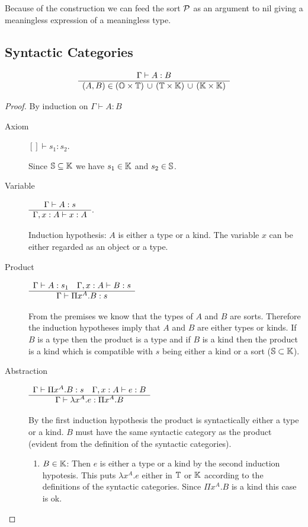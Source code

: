 Because of the construction we can feed the sort ${\cal P}$ as an argument to
$\text{nil}$ giving a meaningless expression of a meaningless type.


\subsection{Syntactic Categories}

\begin{theorem}
  $$
  \begin{array}{c} \Gamma \vdash A : B \\ \hline (A,B) \in
    (\mathbb{O} \times \mathbb{T}) \,\cup\,
    (\mathbb{T}   \times \mathbb{K}) \,\cup\,
    (\mathbb{K}   \times \mathbb{K})
  \end{array}
  $$
  \begin{proof} By induction on $\Gamma \vdash A : B$
    \begin{description}

    \item[Axiom] $[] \vdash s_1 : s_2$.

      Since $\mathbb{S} \subseteq \mathbb{K}$ we have $s_1 \in \mathbb{K}$ and $s_2 \in
      \mathbb{S}$.


    \item[Variable] $\begin{array}{c} \Gamma \vdash A:s \\ \hline \Gamma,x:A \vdash x: A\end{array}$.

      Induction hypothesis: $A$ is either a type or a kind. The variable $x$
      can be either regarded as an object or a type.

    \item[Product]
      $
      \begin{array}{c} \Gamma \vdash A: s_1 \quad \Gamma,x:A \vdash B:s \\ \hline \Gamma \vdash \Pi x^A . B : s\end{array}
      $

      From the premises we know that the types of $A$ and $B$ are
      sorts. Therefore the induction hypotheses imply that $A$ and $B$ are
      either types or kinds. If $B$ is a type then the product is a type and
      if $B$ is a kind then the product is a kind which is compatible with $s$
      being either a kind or a sort ($\mathbb{S} \subset \mathbb{K}$).

    \item[Abstraction]
      $\begin{array}{c} \Gamma \vdash \Pi x^A.B : s \quad
      \Gamma,x:A \vdash e : B \\ \hline \Gamma \vdash \lambda x^A.e : \Pi x^A. B\end{array}$

      By the first induction hypothesis the product is syntactically either a
      type or a kind. $B$ must have the same syntactic category as the product
      (evident from the definition of the syntactic categories).

      \begin{enumerate}
        \item $B \in \mathbb{K}$: Then $e$ is either a type or a kind by the second
          induction hypotesis. This puts $\lambda x^A.e$ either in $\mathbb{T}$ or
          $\mathbb{K}$ according to the definitions of the syntactic
          categories. Since $\Pi x^A.B$ is a kind this case is ok.


\end{enumerate}
\end{description}
\end{proof}
\end{theorem}
